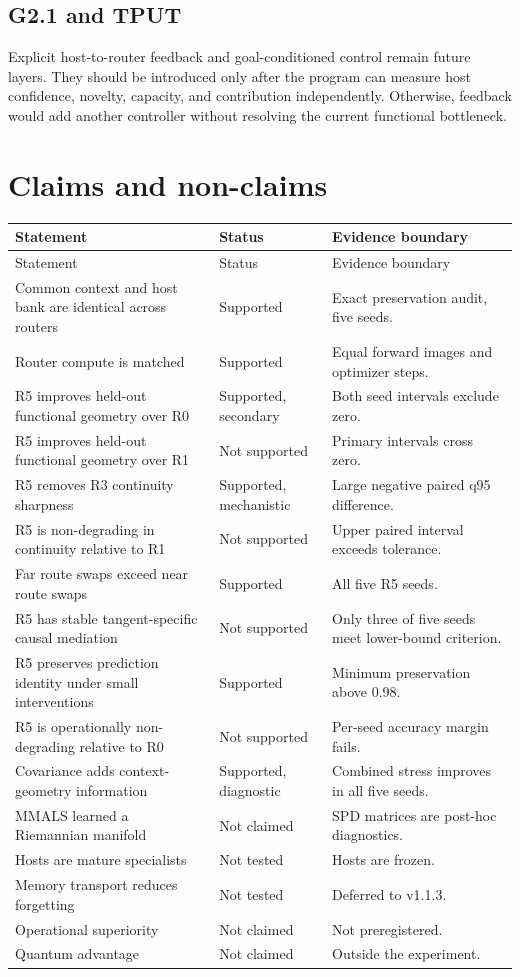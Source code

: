\documentclass[11pt,a4paper]{article}
\begin{document}
\subsection{G2.1 and TPUT}
Explicit host-to-router feedback and goal-conditioned control remain future layers. They should be introduced only after the program can measure host confidence, novelty, capacity, and contribution independently. Otherwise, feedback would add another controller without resolving the current functional bottleneck.

\section{Claims and non-claims}
\begin{longtable}{@{}p{}p{}p{}@{}}
\toprule
Statement & Status & Evidence boundary \\
\midrule
\endfirsthead
\toprule
Statement & Status & Evidence boundary \\
\midrule
\endhead
Common context and host bank are identical across routers & Supported & Exact preservation audit, five seeds. \\
Router compute is matched & Supported & Equal forward images and optimizer steps. \\
R5 improves held-out functional geometry over R0 & Supported, secondary & Both seed intervals exclude zero. \\
R5 improves held-out functional geometry over R1 & Not supported & Primary intervals cross zero. \\
R5 removes R3 continuity sharpness & Supported, mechanistic & Large negative paired q95 difference. \\
R5 is non-degrading in continuity relative to R1 & Not supported & Upper paired interval exceeds tolerance. \\
Far route swaps exceed near route swaps & Supported & All five R5 seeds. \\
R5 has stable tangent-specific causal mediation & Not supported & Only three of five seeds meet lower-bound criterion. \\
R5 preserves prediction identity under small interventions & Supported & Minimum preservation above 0.98. \\
R5 is operationally non-degrading relative to R0 & Not supported & Per-seed accuracy margin fails. \\
Covariance adds context-geometry information & Supported, diagnostic & Combined stress improves in all five seeds. \\
MMALS learned a Riemannian manifold & Not claimed & SPD matrices are post-hoc diagnostics. \\
Hosts are mature specialists & Not tested & Hosts are frozen. \\
Memory transport reduces forgetting & Not tested & Deferred to v1.1.3. \\
Operational superiority & Not claimed & Not preregistered. \\
Quantum advantage & Not claimed & Outside the experiment. \\
\bottomrule
\end{longtable}
\end{document}
